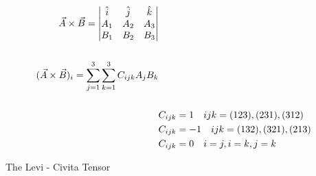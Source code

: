 \documentclass[svgnames]{article}   	%
\begin{document}
\begin{align*}
  \vec{A} \times \vec{B} = \begin{vmatrix} 
    \hat{i} & \hat{j} & \hat{k} \\
  A_1 & A_2 & A_3 \\
  B_1 & B_2 & B_3 
  \end{vmatrix} \\\\
  (\vec{A} \times \vec{B})_i = \sum_{j=1}^3\sum_{k=1}^3 C_{ijk} A_j B_k \\\\
  &C_{ijk} = 1 \hspace{10px} ijk = (123), (231), (312) \\
  &C_{ijk} = -1 \hspace{10px} ijk = (132), (321), (213) \\
  &C_{ijk} = 0 \hspace{10px} i = j, i = k, j = k
\end{align*}

The Levi - Civita Tensor
\end{document}
